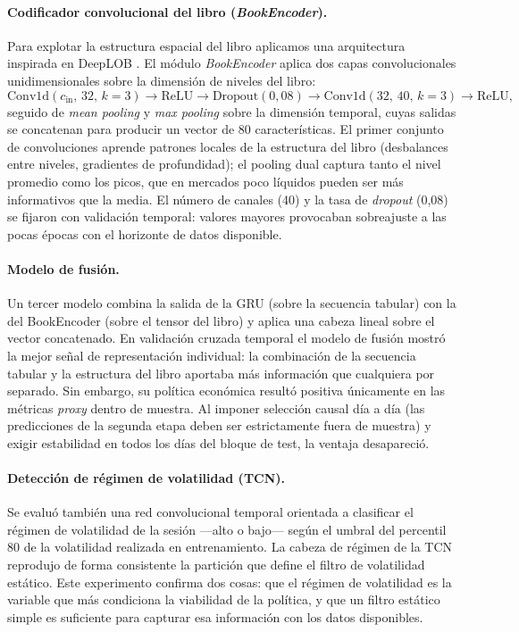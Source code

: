 \documentclass[11pt,a4paper]{article}
\begin{document}
\paragraph{Codificador convolucional del libro (\emph{BookEncoder}).}
Para explotar la estructura espacial del libro aplicamos una arquitectura
inspirada en DeepLOB \cite{zhang2019deeplob, tsantekidis2017}. El módulo
\textit{BookEncoder} aplica dos capas convolucionales unidimensionales sobre la
dimensión de niveles del libro:
\[
  \text{Conv1d}(c_{\mathrm{in}},\,32,\,k{=}3) \to \text{ReLU} \to
  \text{Dropout}(0{,}08) \to \text{Conv1d}(32,\,40,\,k{=}3) \to \text{ReLU},
\]
seguido de \emph{mean pooling} y \emph{max pooling} sobre la dimensión temporal,
cuyas salidas se concatenan para producir un vector de 80 características. El
primer conjunto de convoluciones aprende patrones locales de la estructura del
libro (desbalances entre niveles, gradientes de profundidad); el pooling dual
captura tanto el nivel promedio como los picos, que en mercados poco líquidos
pueden ser más informativos que la media. El número de canales (40) y la tasa de
\emph{dropout} (0{,}08) se fijaron con validación temporal: valores mayores
provocaban sobreajuste a las pocas épocas con el horizonte de datos disponible.

\paragraph{Modelo de fusión.}
Un tercer modelo combina la salida de la GRU (sobre la secuencia tabular) con la
del BookEncoder (sobre el tensor del libro) y aplica una cabeza lineal sobre el
vector concatenado. En validación cruzada temporal el modelo de fusión mostró la
mejor señal de representación individual: la combinación de la secuencia tabular
y la estructura del libro aportaba más información que cualquiera por separado.
Sin embargo, su política económica resultó positiva únicamente en las métricas
\emph{proxy} dentro de muestra. Al imponer selección causal día a día (las
predicciones de la segunda etapa deben ser estrictamente fuera de muestra) y
exigir estabilidad en todos los días del bloque de test, la ventaja desapareció.

\paragraph{Detección de régimen de volatilidad (TCN).}
Se evaluó también una red convolucional temporal orientada a clasificar el régimen
de volatilidad de la sesión ---alto o bajo--- según el umbral del percentil 80 de
la volatilidad realizada en entrenamiento. La cabeza de régimen de la TCN
reprodujo de forma consistente la partición que define el filtro de volatilidad
estático. Este experimento confirma dos cosas: que el régimen de volatilidad es la
variable que más condiciona la viabilidad de la política, y que un filtro estático
simple es suficiente para capturar esa información con los datos disponibles.
\end{document}
